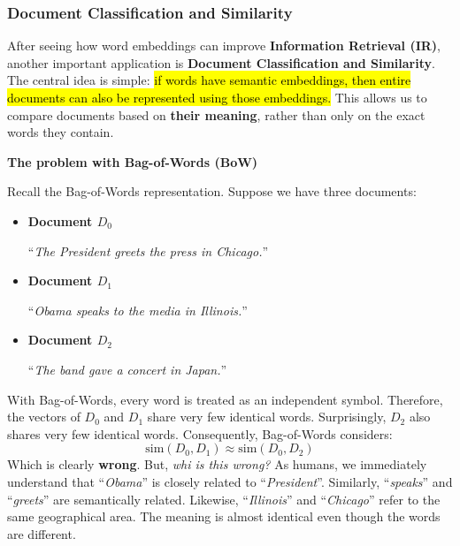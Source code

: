 \subsubsection{Document Classification and Similarity}\label{sec:document-classification-and-similarity}

After seeing how word embeddings can improve \textbf{Information Retrieval (IR)}, another important application is \textbf{Document Classification and Similarity}. The central idea is simple: \hl{if words have semantic embeddings, then entire documents can also be represented using those embeddings.} This allows us to compare documents based on \textbf{their meaning}, rather than only on the exact words they contain.

\highspace
\begin{flushleft}
    \textcolor{Red2}{ \textbf{The problem with Bag-of-Words (BoW)}}
\end{flushleft}
Recall the Bag-of-Words representation. Suppose we have three documents:
\begin{itemize}
    \item \textbf{Document $D_{0}$}
    \begin{center}
        ``\emph{The President greets the press in Chicago.}''
    \end{center}
    \item \textbf{Document $D_{1}$}
    \begin{center}
        ``\emph{Obama speaks to the media in Illinois.}''
    \end{center}
    \item \textbf{Document $D_{2}$}
    \begin{center}
        ``\emph{The band gave a concert in Japan.}''
    \end{center}
\end{itemize}
With Bag-of-Words, every word is treated as an independent symbol. Therefore, the vectors of $D_0$ and $D_1$ share very few identical words. Surprisingly, $D_2$ also shares very few identical words. Consequently, Bag-of-Words considers:
\begin{equation*}
    \mathrm{sim}\left(D_0, D_1\right) \approx \mathrm{sim}\left(D_0, D_2\right)
\end{equation*}
Which is clearly \textbf{wrong}. But, \emph{whi is this wrong?} As humans, we immediately understand that ``\emph{Obama}'' is closely related to ``\emph{President}''. Similarly, ``\emph{speaks}'' and ``\emph{greets}'' are semantically related. Likewise, ``\emph{Illinois}'' and ``\emph{Chicago}'' refer to the same geographical area. The meaning is almost identical even though the words are different.

